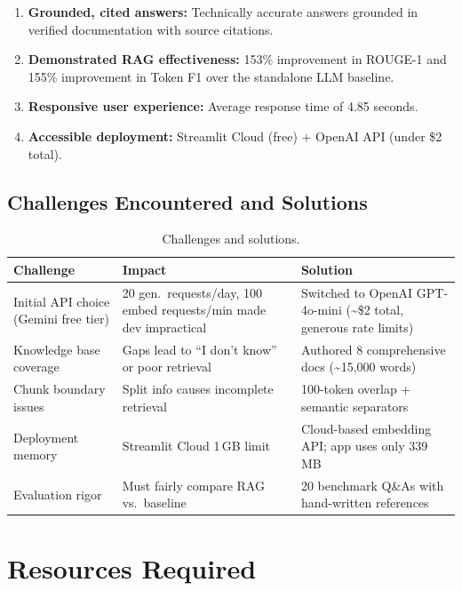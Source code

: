 \documentclass[12pt, a4paper]{article}
\begin{document}
\begin{enumerate}[nosep]
    \item \textbf{Grounded, cited answers:} Technically accurate answers grounded in verified documentation with source citations.
    \item \textbf{Demonstrated RAG effectiveness:} 153\% improvement in ROUGE-1 and 155\% improvement in Token F1 over the standalone LLM baseline.
    \item \textbf{Responsive user experience:} Average response time of 4.85 seconds.
    \item \textbf{Accessible deployment:} Streamlit Cloud (free) + OpenAI API (under \$2 total).
\end{enumerate}

\subsection{Challenges Encountered and Solutions}

\begin{table}[h]
\centering
\small
\begin{tabular}{@{}p{3.5cm}p{4cm}p{5.5cm}@{}}
\toprule
\textbf{Challenge} & \textbf{Impact} & \textbf{Solution} \\
\midrule
Initial API choice (Gemini free tier) & 20 gen.\ requests/day, 100 embed requests/min made dev impractical & Switched to OpenAI GPT-4o-mini (\textasciitilde\$2 total, generous rate limits) \\
\addlinespace
Knowledge base coverage & Gaps lead to ``I don't know'' or poor retrieval & Authored 8 comprehensive docs (\textasciitilde15,000 words) \\
\addlinespace
Chunk boundary issues & Split info causes incomplete retrieval & 100-token overlap + semantic separators \\
\addlinespace
Deployment memory & Streamlit Cloud 1\,GB limit & Cloud-based embedding API; app uses only 339\,MB \\
\addlinespace
Evaluation rigor & Must fairly compare RAG vs.\ baseline & 20 benchmark Q\&As with hand-written references \\
\bottomrule
\end{tabular}
\caption{Challenges and solutions.}
\end{table}


\section{Resources Required}
\end{document}
